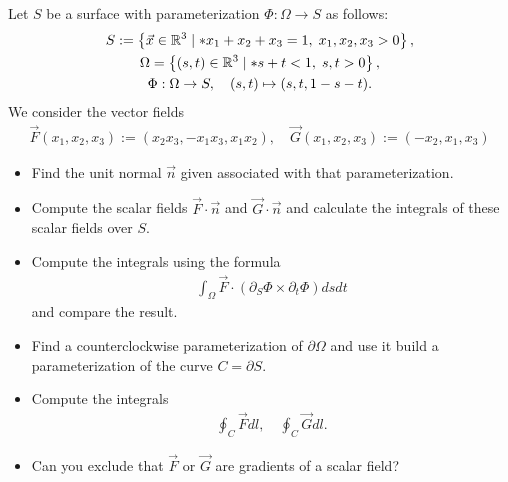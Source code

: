 \documentclass[11pt]{article}
\begin{document}
\begin{exercise} %
    Let $S$ be a surface with parameterization $\Phi : \Omega \to S$ as follows:
    \begin{gather}
     S := \left\{ \vec x \in \bbR^3 \suchthat* x_1 + x_2 + x_3 = 1, \; x_1, x_2, x_3 > 0 \right\},
     \\
     \Omega = \left\{ (s,t) \in \bbR^3 \suchthat* s + t < 1, \; s, t > 0 \right\},
     \\ 
     \Phi : \Omega \to S, \quad (s,t) \mapsto (s,t,1-s-t).
    \end{gather}
    We consider the vector fields 
    \begin{align}
        \vec F(x_1,x_2,x_3) := (x_2 x_3, -x_1 x_3, x_1 x_2), \quad \vec G(x_1,x_2,x_3) := (-x_2, x_1,x_3)
    \end{align}
    \begin{itemize}
     \item
     Find the unit normal $\vec n$ given associated with that parameterization.
     \item
     Compute the scalar fields $\vec F \cdot \vec n$ and $\vec G \cdot \vec n$ and calculate the integrals of these scalar fields over $S$.
     \item
     Compute the integrals using the formula 
     \begin{align}
        \int_\Omega \vec F \cdot ( \partial_S \Phi \times \partial_t \Phi ) dsdt
     \end{align}
     and compare the result. 
     \item 
     Find a counterclockwise parameterization of $\partial\Omega$ and use it build a parameterization of the curve $C = \partial S$.
     \item 
     Compute the integrals 
     \begin{align}
        \oint_C \vec F dl, \quad \oint_C \vec G dl.
     \end{align}
     \item 
     Can you exclude that $\vec F$ or $\vec G$ are gradients of a scalar field?
    \end{itemize}
\end{exercise}
\end{document}
